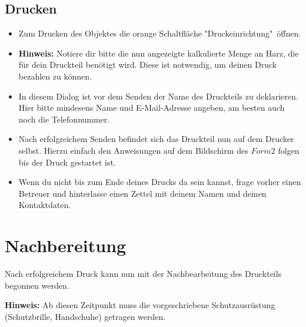 \documentclass{\basedir/fablab-document}
\begin{document}
\subsection{Drucken}
 \begin{itemize}
 		
		\item Zum Drucken des Objektes die orange Schaltfläche "Druckeinrichtung"\ öffnen.\\
		\item \textbf{Hinweis:} Notiere dir bitte die nun angezeigte kalkulierte Menge an Harz, die für dein Druckteil benötigt wird. Diese ist notwendig, um deinen Druck bezahlen zu können.
		\item In diesem Dialog ist vor dem Senden der Name des Druckteils zu deklarieren. Hier bitte mindesens Name und E-Mail-Adresse angeben, am besten auch noch die Telefonnummer.\\
		\item Nach erfolgreichem Senden befindet sich das Druckteil nun auf dem Drucker selbst. Hierzu einfach den Anweisungen auf dem Bildschirm des $Form2$ folgen bis der Druck gestartet ist.
		\item Wenn du nicht bis zum Ende deines Drucks da sein kannst, frage vorher einen Betreuer und hinterlasse einen Zettel mit deinem Namen und deinen Kontaktdaten.
		
\end{itemize}

	\pagebreak
	
	
\section{Nachbereitung}

Nach erfolgreichem Druck kann nun mit der Nachbearbeitung des Druckteils begonnen werden. 

\textbf{Hinweis:} Ab diesen Zeitpunkt muss die vorgeschriebene Schutzausrüstung (Schutzbrille, Handschuhe) getragen werden.
\end{document}
